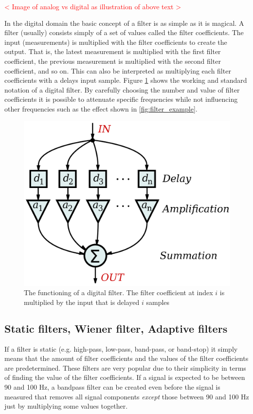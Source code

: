 \textcolor{red}{< Image of analog vs digital as illustration of above text >}

In the digital domain the basic concept of a filter is as simple as it is magical. A filter (usually) consists simply of a set of values called the filter coefficients. The input (measurements) is multiplied with the filter coefficients to create the output. That is, the latest measurement is multiplied with the first filter coefficient, the previous measurement is multiplied with the second filter coefficient, and so on. This can also be interpreted as multiplying each filter coefficients with a delays input sample. Figure \ref{fig:wiki_digital_filter_working} shows the working and standard notation of a digital filter.
By carefully choosing the number and value of filter coefficients it is possible to attenuate specific frequencies while not influencing other frequencies such as the effect shown in \ref{fig:filter_example}.

\begin{figure}[h!t]
	\begin{center}
		\includegraphics[width=1.0\columnwidth]{images/wikipedia_fir_digital_filter.png}
	\end{center}
	\caption{The functioning of a digital filter. The filter coefficient at index $i$ is multiplied by the input that is delayed $i$ samples \cite{wikipedia:digital_fir_filter_image}}
	\label{fig:wiki_digital_filter_working}
\end{figure}

\subsection{Static filters, Wiener filter, Adaptive filters}
If a filter is static (e.g. high-pass, low-pass, band-pass, or band-stop) it simply means that the amount of filter coefficients and the values of the filter coefficients are predetermined. These filters are very popular due to their simplicity in terms of finding the value of the filter coefficients. If a signal is expected to be between 90 and 100 Hz, a bandpass filter can be created even before the signal is measured that removes all signal components \textit{except} those between 90 and 100 Hz just by multiplying some values together. 

